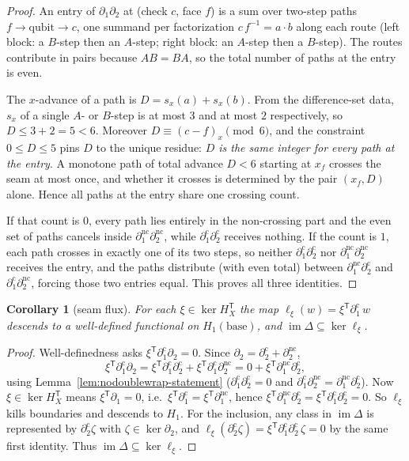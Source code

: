 \documentclass[11pt]{article}
\DeclareMathOperator{\img}{im}
\newcommand{\dcut}{\partial_2^{\mathrm{c}}}     %
\newcommand{\dncut}{\partial_2^{\mathrm{nc}}}   %
\newcommand{\cmap}{\Delta}                       %
\theoremstyle{plain}
\newtheorem{corollary}[lemma]{Corollary}
\theoremstyle{definition}
\theoremstyle{remark}
\begin{document}
\begin{proof}
An entry of $\partial_1\partial_2$ at (check $c$, face $f$) is a sum over two-step
paths $f\to\text{qubit}\to c$, one summand per factorization $c\,f^{-1}=a\cdot b$
along each route (left block: a $B$-step then an $A$-step; right block: an
$A$-step then a $B$-step). The routes contribute in pairs because $AB=BA$, so the
total number of paths at the entry is even.

The $x$-advance of a path is $D=s_x(a)+s_x(b)$. From the difference-set data,
$s_x$ of a single $A$- or $B$-step is at most $3$ and at most $2$ respectively, so
$D\le 3+2=5<6$. Moreover $D\equiv (c-f)_x\pmod 6$, and the constraint $0\le D\le 5$
pins $D$ to the unique residue: \emph{$D$ is the same integer for every path at
the entry}. A monotone path of total advance $D<6$ starting at $x_f$ crosses the
seam at most once, and whether it crosses is determined by the pair $(x_f,D)$
alone. Hence all paths at the entry share one crossing count.

If that count is $0$, every path lies entirely in the non-crossing part and the
even set of paths cancels inside $\partial_1^{\mathrm{nc}}\dncut$, while
$\partial_1^{\mathrm c}\dcut$ receives nothing. If the count is $1$, each path
crosses in exactly one of its two steps, so neither
$\partial_1^{\mathrm c}\dcut$ nor $\partial_1^{\mathrm{nc}}\dncut$ receives the
entry, and the paths distribute (with even total) between
$\partial_1^{\mathrm{nc}}\dcut$ and $\partial_1^{\mathrm c}\dncut$, forcing those
two entries equal. This proves all three identities.
\end{proof}

\begin{corollary}[seam flux]\label{cor:flux}
For each $\xi\in\ker H_X^{\mathsf T}$ the map
$\ell_\xi(w)=\xi^{\mathsf T}\partial_1^{\mathrm c}\,w$ descends to a well-defined
functional on $H_1(\mathrm{base})$, and $\img\cmap\subseteq\ker\ell_\xi$.
\end{corollary}

\begin{proof}
Well-definedness asks $\xi^{\mathsf T}\partial_1^{\mathrm c}\partial_2=0$. Since
$\partial_2=\dcut+\dncut$,
\[
  \xi^{\mathsf T}\partial_1^{\mathrm c}\partial_2
  =\xi^{\mathsf T}\partial_1^{\mathrm c}\dcut+\xi^{\mathsf T}\partial_1^{\mathrm c}\dncut
  =0+\xi^{\mathsf T}\partial_1^{\mathrm{nc}}\dcut ,
\]
using Lemma~\ref{lem:nodoublewrap-statement} ($\partial_1^{\mathrm c}\dcut=0$ and
$\partial_1^{\mathrm c}\dncut=\partial_1^{\mathrm{nc}}\dcut$). Now $\xi\in\ker H_X^{\mathsf T}$
means $\xi^{\mathsf T}\partial_1=0$, i.e.\
$\xi^{\mathsf T}\partial_1^{\mathrm c}=\xi^{\mathsf T}\partial_1^{\mathrm{nc}}$, hence
$\xi^{\mathsf T}\partial_1^{\mathrm{nc}}\dcut=\xi^{\mathsf T}\partial_1^{\mathrm c}\dcut=0$.
So $\ell_\xi$ kills boundaries and descends to $H_1$. For the inclusion, any class
in $\img\cmap$ is represented by $\dcut\zeta$ with $\zeta\in\ker\partial_2$, and
$\ell_\xi(\dcut\zeta)=\xi^{\mathsf T}\partial_1^{\mathrm c}\dcut\,\zeta=0$ by the
same first identity. Thus $\img\cmap\subseteq\ker\ell_\xi$.
\end{proof}
\end{document}
